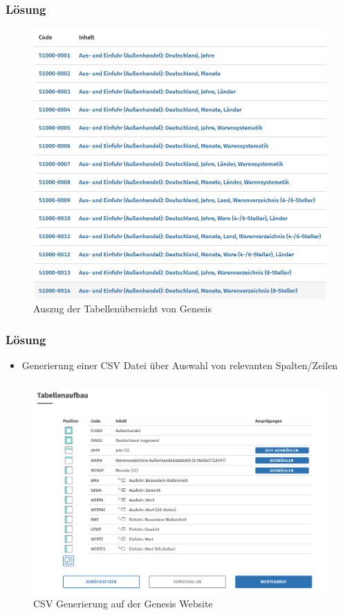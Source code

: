 \documentclass{beamer}
\begin{document}
\begin{frame}
	\frametitle{Lösung}
	\begin{figure}[h]
		\caption{Auszug der Tabellenübersicht von Genesis}
		\centering
		\includegraphics[scale=0.2]{8_Tabellen_codes}
	\end{figure}
\end{frame}

\begin{frame}
	\frametitle{Lösung}
	\begin{itemize}
		\item Generierung einer CSV Datei über Auswahl von relevanten Spalten/Zeilen
	\end{itemize}
\end{frame}

\begin{frame}
	\frametitle{}
	\begin{figure}[h]
		\caption{CSV Generierung auf der Genesis Website}
		\centering
		\includegraphics[scale=0.25]{9_Tabellanaufbau}
	\end{figure}
\end{frame}
\end{document}

